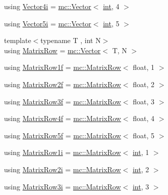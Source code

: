 \begin{DoxyCompactItemize}
using \hyperlink{namespacemc_a2886018be91992764bd5cf4e57f56cd8}{Vector4i} = \hyperlink{classmc_1_1_vector}{mc\+::\+Vector}$<$ \hyperlink{_s_d_l__thread_8h_a6a64f9be4433e4de6e2f2f548cf3c08e}{int}, 4 $>$
\item 
using \hyperlink{namespacemc_a7ed5c5e05ed6579a2bd14ad0e00fc8d8}{Vector5i} = \hyperlink{classmc_1_1_vector}{mc\+::\+Vector}$<$ \hyperlink{_s_d_l__thread_8h_a6a64f9be4433e4de6e2f2f548cf3c08e}{int}, 5 $>$
\item 
{\footnotesize template$<$typename T , int N$>$ }\\using \hyperlink{namespacemc_a864ada9f6799e62e26d4b02bbd1ac4c2}{Matrix\+Row} = \hyperlink{classmc_1_1_vector}{mc\+::\+Vector}$<$ T, N $>$
\item 
using \hyperlink{namespacemc_a5a0f82f5a673329409088bb9dd2d7f7b}{Matrix\+Row1f} = \hyperlink{namespacemc_a864ada9f6799e62e26d4b02bbd1ac4c2}{mc\+::\+Matrix\+Row}$<$ float, 1 $>$
\item 
using \hyperlink{namespacemc_a3b4a3205e212db1db4bc8e47fe4cc312}{Matrix\+Row2f} = \hyperlink{namespacemc_a864ada9f6799e62e26d4b02bbd1ac4c2}{mc\+::\+Matrix\+Row}$<$ float, 2 $>$
\item 
using \hyperlink{namespacemc_a8b0d875a0b758d1b6ca600bfca37f1b9}{Matrix\+Row3f} = \hyperlink{namespacemc_a864ada9f6799e62e26d4b02bbd1ac4c2}{mc\+::\+Matrix\+Row}$<$ float, 3 $>$
\item 
using \hyperlink{namespacemc_ac76f1616fbf0b724f9a8b957b2635475}{Matrix\+Row4f} = \hyperlink{namespacemc_a864ada9f6799e62e26d4b02bbd1ac4c2}{mc\+::\+Matrix\+Row}$<$ float, 4 $>$
\item 
using \hyperlink{namespacemc_a2dc58d627f7c4287360df5a1852050d4}{Matrix\+Row5f} = \hyperlink{namespacemc_a864ada9f6799e62e26d4b02bbd1ac4c2}{mc\+::\+Matrix\+Row}$<$ float, 5 $>$
\item 
using \hyperlink{namespacemc_a93694e95604472a1c26070b1b70990cb}{Matrix\+Row1i} = \hyperlink{namespacemc_a864ada9f6799e62e26d4b02bbd1ac4c2}{mc\+::\+Matrix\+Row}$<$ \hyperlink{_s_d_l__thread_8h_a6a64f9be4433e4de6e2f2f548cf3c08e}{int}, 1 $>$
\item 
using \hyperlink{namespacemc_a668aec14caead769bdd4d7066e8e15fe}{Matrix\+Row2i} = \hyperlink{namespacemc_a864ada9f6799e62e26d4b02bbd1ac4c2}{mc\+::\+Matrix\+Row}$<$ \hyperlink{_s_d_l__thread_8h_a6a64f9be4433e4de6e2f2f548cf3c08e}{int}, 2 $>$
\item 
using \hyperlink{namespacemc_a3ed70e2494e81425a982a4d7abedb1b8}{Matrix\+Row3i} = \hyperlink{namespacemc_a864ada9f6799e62e26d4b02bbd1ac4c2}{mc\+::\+Matrix\+Row}$<$ \hyperlink{_s_d_l__thread_8h_a6a64f9be4433e4de6e2f2f548cf3c08e}{int}, 3 $>$

\end{DoxyCompactItemize}
